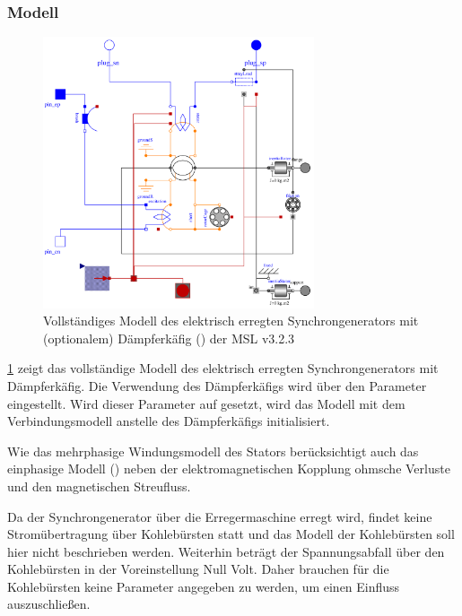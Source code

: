 \hypertarget{sec:Modell-SG}{%
\subsubsection{Modell}\label{sec:Modell-SG}}
\begin{figure}
    \centering
    \includegraphics[height=8cm]{Bilder/SM_ElectricalExcited.pdf}
    \caption{Vollständiges Modell des elektrisch erregten Synchrongenerators mit (optionalem) Dämpferkäfig () der MSL v3.2.3}
    \label{fig:Synchrongenerator}
\end{figure}
\cref{fig:Synchrongenerator} zeigt das vollständige Modell des elektrisch erregten Synchrongenerators mit Dämpferkäfig. Die Verwendung des Dämpferkäfigs wird über den Parameter  eingestellt. Wird dieser Parameter auf  gesetzt, wird das Modell mit dem Verbindungsmodell  anstelle des Dämpferkäfigs initialisiert. 


Wie das mehrphasige Windungsmodell des Stators
berücksichtigt auch das einphasige Modell () neben der elektromagnetischen
Kopplung ohmsche Verluste und den magnetischen Streufluss.

Da der Synchrongenerator über die Erregermaschine erregt wird, findet
keine Stromübertragung über Kohlebürsten statt und das Modell der
Kohlebürsten soll hier nicht beschrieben werden. Weiterhin beträgt der
Spannungsabfall über den Kohlebürsten in der Voreinstellung Null Volt.
Daher brauchen für die Kohlebürsten keine Parameter angegeben zu werden,
um einen Einfluss auszuschließen.

